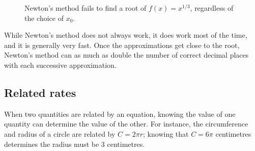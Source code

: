 \begin{figure}[h]
\centering
{}
\qquad
{}
\qquad
{}
\caption{Newton's method fails to find a root of $f(x) = x^{1/3}$, regardless of the choice of $x_0$.\label{fig_diff_15}}
\end{figure}


\fi

While Newton's method does not always work, it does work most of the time, and it is generally very fast. Once the approximations get close to the root, Newton's method can as much as double the number of correct decimal places with each successive approximation. 


\ifanalysis

\subsection{Related rates}\label{sec:related_rates}
When two quantities are related by an equation, knowing the value of one quantity can determine the value of the other. For instance, the circumference and radius of a circle are related by $C=2\pi r$; knowing that $C = 6\pi$ centimetres determines the radius must be 3 centimetres.


